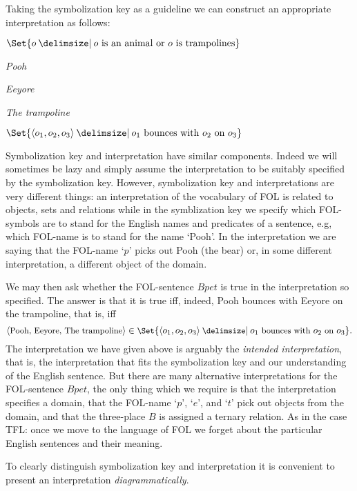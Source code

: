 Taking the symbolization key as a guideline we can construct an appropriate interpretation as follows:
\begin{interp}
\item[\domain]$\Set{o \given o\text{ is an animal or }o\text{ is trampolines}}$
\item[\denote{p}]\emph{Pooh}
\item[\denote{e}]\emph{Eeyore}
\item[\denote{t}]\emph{The trampoline}
\item[\denote{B}]$\Set{\langle o_1,o_2,o_3\rangle \given o_1\text{ bounces with }o_2\text{ on }o_3}$
\end{interp}
Symbolization key and interpretation have similar components. Indeed we will sometimes be lazy and simply assume the interpretation to be suitably specified by the symbolization key. However, symbolization key and interpretations are very different things: an interpretation of the vocabulary of FOL is related to objects, sets and relations while in the symblization key we specify which FOL-symbols are to stand for the English names and predicates of a sentence, e.g, which FOL-name is to stand for the name `Pooh'. In the interpretation we are saying that the FOL-name `$p$' picks out Pooh (the bear) or, in some different interpretation, a different object of the domain. 

We may then ask whether the FOL-sentence $Bpet$ is true in the interpretation so specified. The answer is that it is true iff, indeed, Pooh bounces with Eeyore on the trampoline, that is, iff
$${\small \langle \text{Pooh, Eeyore, The trampoline}\rangle\in\Set{\langle o_1,o_2,o_3\rangle \given o_1\text{ bounces with }o_2\text{ on }o_3}.}$$
The interpretation we have given above is arguably the \emph{intended interpretation}, that is, the interpretation that fits the symbolization key and our understanding of the English sentence. But there are many alternative interpretations for the FOL-sentence $Bpet$, the only thing which we require is that the interpretation specifies a domain, that the FOL-name `$p$', `$e$', and `$t$' pick out objects from the domain, and that the three-place $B$ is assigned a ternary relation. As in the case TFL: once we move to the language of FOL we forget about the particular English sentences and their meaning.


To clearly distinguish symbolization key and interpretation it is convenient to present an interpretation \emph{diagrammatically}.


